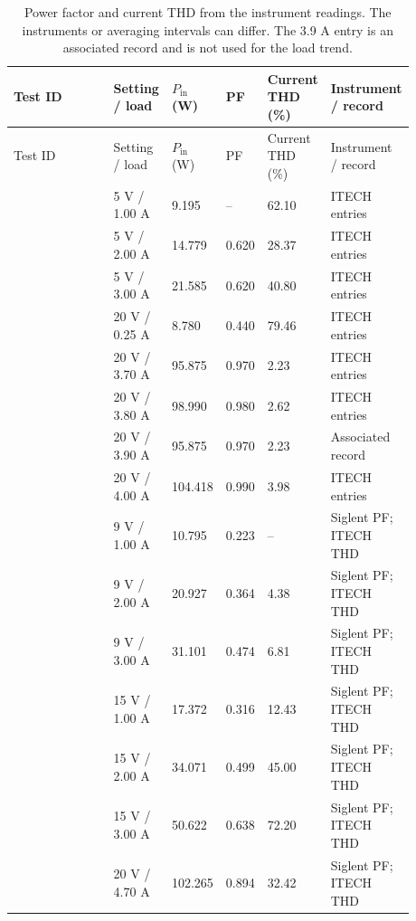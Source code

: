 \begingroup
\scriptsize
\setlength{\tabcolsep}{3pt}
\renewcommand{\arraystretch}{1.12}
\begin{longtable}{@{}L{0.2728\linewidth} L{0.1408\linewidth} L{0.1056\linewidth} L{0.0704\linewidth} L{0.1056\linewidth} L{0.1848\linewidth}@{}}
\caption{Power factor and current THD from the instrument readings. The instruments or averaging intervals can differ. The 3.9 A entry is an associated record and is not used for the load trend.}\label{tab:pq-results}\\
\toprule
Test ID & Setting / load & $P_\mathrm{in}$ (W) & PF & Current THD (\%) & Instrument / record\\
\midrule
\endfirsthead
\toprule
Test ID & Setting / load & $P_\mathrm{in}$ (W) & PF & Current THD (\%) & Instrument / record\\
\midrule
\endhead
{} & 5 V / 1.00 A & 9.195 & -- & 62.10 & ITECH entries\\
 & 5 V / 2.00 A & 14.779 & 0.620 & 28.37 & ITECH entries\\
 & 5 V / 3.00 A & 21.585 & 0.620 & 40.80 & ITECH entries\\
 & 20 V / 0.25 A & 8.780 & 0.440 & 79.46 & ITECH entries\\
 & 20 V / 3.70 A & 95.875 & 0.970 & 2.23 & ITECH entries\\
 & 20 V / 3.80 A & 98.990 & 0.980 & 2.62 & ITECH entries\\
 & 20 V / 3.90 A & 95.875 & 0.970 & 2.23 & Associated record\\
 & 20 V / 4.00 A & 104.418 & 0.990 & 3.98 & ITECH entries\\
 & 9 V / 1.00 A & 10.795 & 0.223 & -- & Siglent PF; ITECH THD\\
 & 9 V / 2.00 A & 20.927 & 0.364 & 4.38 & Siglent PF; ITECH THD\\
 & 9 V / 3.00 A & 31.101 & 0.474 & 6.81 & Siglent PF; ITECH THD\\
 & 15 V / 1.00 A & 17.372 & 0.316 & 12.43 & Siglent PF; ITECH THD\\
 & 15 V / 2.00 A & 34.071 & 0.499 & 45.00 & Siglent PF; ITECH THD\\
 & 15 V / 3.00 A & 50.622 & 0.638 & 72.20 & Siglent PF; ITECH THD\\
 & 20 V / 4.70 A & 102.265 & 0.894 & 32.42 & Siglent PF; ITECH THD\\
\bottomrule
\end{longtable}
\endgroup
